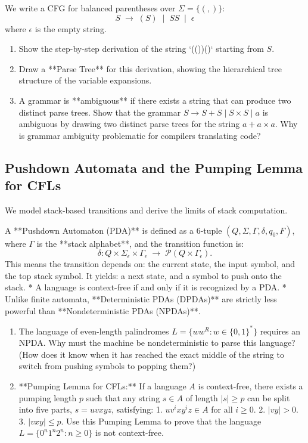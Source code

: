 \documentclass[12pt, a4paper]{book}
\begin{document}
\begin{explobox}
We write a CFG for balanced parentheses over $\Sigma = \{(, )\}$:
\[
  S \;\to\; (S) \;\mid\; SS \;\mid\; \epsilon
\]
where $\epsilon$ is the empty string.
\begin{enumerate}[label=(\alph*), leftmargin=*]
  \item Show the step-by-step derivation of the string `(())()` starting from $S$.
  \item Draw a **Parse Tree** for this derivation, showing the hierarchical tree structure of the variable expansions.
  \item A grammar is **ambiguous** if there exists a string that can produce two distinct parse trees.
        Show that the grammar $S \to S + S \mid S \times S \mid a$ is ambiguous by drawing two distinct parse trees for the string $a + a \times a$.
        Why is grammar ambiguity problematic for compilers translating code?
\end{enumerate}
\end{explobox}

\subsection{Pushdown Automata and the Pumping Lemma for CFLs}

We model stack-based transitions and derive the limits of stack computation.

\begin{explobox}
A **Pushdown Automaton (PDA)** is defined as a 6-tuple $(Q, \Sigma, \Gamma, \delta, q_0, F)$, where $\Gamma$ is the **stack alphabet**, and the transition function is:
\[
  \delta: Q \times \Sigma_\epsilon \times \Gamma_\epsilon \;\to\; \mathcal{P}(Q \times \Gamma_\epsilon).
\]
This means the transition depends on: the current state, the input symbol, and the top stack symbol. It yields: a next state, and a symbol to push onto the stack.
* A language is context-free if and only if it is recognized by a PDA.
* Unlike finite automata, **Deterministic PDAs (DPDAs)** are strictly less powerful than **Nondeterministic PDAs (NPDAs)**.
\begin{enumerate}[label=(\alph*), leftmargin=*]
  \item The language of even-length palindromes $L = \{w w^R : w \in \{0, 1\}^*\}$ requires an NPDA.
        Why must the machine be nondeterministic to parse this language? (How does it know when it has reached the exact middle of the string to switch from pushing symbols to popping them?)
  \item **Pumping Lemma for CFLs:** If a language $A$ is context-free, there exists a pumping length $p$ such that any string $s \in A$ of length $|s| \ge p$ can be split into five parts, $s = u v x y z$, satisfying:
        1. $u v^i x y^i z \in A$ for all $i \ge 0$.
        2. $|v y| > 0$.
        3. $|v x y| \le p$.
        Use this Pumping Lemma to prove that the language $L = \{0^n 1^n 2^n : n \ge 0\}$ is not context-free.
\end{enumerate}
\end{explobox}
\end{document}
